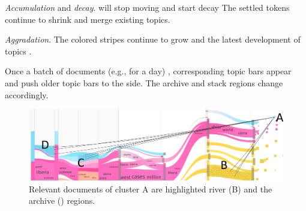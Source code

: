 \emph{\normalsize Accumulation} and \emph{\normalsize decay}.
 will stop moving and start  decay 
The settled tokens continue to shrink and merge  existing topics.

\emph{\normalsize Aggradation}.
The colored stripes continue to grow and  the latest development of topics .

Once a batch of documents (e.g., for a day) ,  corresponding topic bars appear and push older topic bars to the  side.
The archive and stack regions  change accordingly.

\begin{figure}[t]
	\centering
	\includegraphics[width=\columnwidth]{fig/docHighlight}
	\vspace{-4mm}
	\caption{
	Relevant documents of cluster A are highlighted  river (B) and the archive () regions.
	}
\vspace{-5mm}
	\label{fig:dochighlight}
\end{figure}

